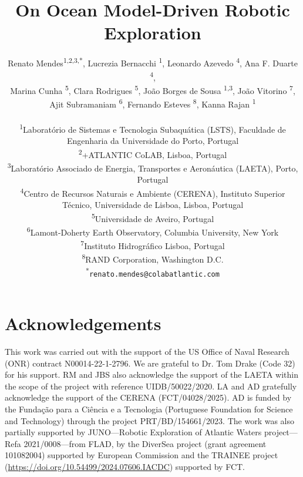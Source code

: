 \documentclass[11pt]{article}
\title{On Ocean Model-Driven Robotic Exploration}
\author{
Renato Mendes\textsuperscript{1,2,3,*},
Lucrezia Bernacchi \textsuperscript{1},
Leonardo Azevedo \textsuperscript{4},
Ana F. Duarte \textsuperscript{4},\\
Marina Cunha \textsuperscript{5},
Clara Rodrigues \textsuperscript{5},
Jo\~{a}o Borges de Sousa \textsuperscript{1,3},
Jo\~{a}o Vitorino \textsuperscript{7},\\
Ajit Subramaniam \textsuperscript{6},
Fernando Esteves \textsuperscript{8},
Kanna Rajan \textsuperscript{1}
\\
\\
\textsuperscript{1}{\scriptsize Laboratório de Sistemas e Tecnologia Subaquática (LSTS), Faculdade de Engenharia da Universidade do Porto, Portugal}\\
\textsuperscript{2}{\scriptsize +ATLANTIC CoLAB, Lisboa, Portugal}\\
\textsuperscript{3}{\scriptsize Laboratório Associado de Energia, Transportes e Aeronáutica (LAETA), Porto, Portugal}\\
\textsuperscript{4}{\scriptsize Centro de Recursos Naturais e Ambiente (CERENA), Instituto Superior T\'{e}cnico, Universidade de Lisboa, Lisboa, Portugal}\\
\textsuperscript{5}{\scriptsize Universidade de Aveiro, Portugal}\\
\textsuperscript{6}{\scriptsize Lamont-Doherty Earth Observatory, Columbia University, New York}\\
\textsuperscript{7}{\scriptsize Instituto Hidrogr{\'a}fico Lisboa, Portugal}\\
\textsuperscript{8}{\scriptsize RAND Corporation, Washington D.C.}\\
\textsuperscript{*}\texttt{{\scriptsize renato.mendes@colabatlantic.com}}
}
\date{}
\begin{document}
\maketitle







\section{Acknowledgements}

This work was carried out with the support of the US Office of Naval
Research (ONR) contract N00014-22-1-2796. We are grateful to Dr. Tom
Drake (Code 32) for his support. RM and JBS also acknowledge the
support of the LAETA within the scope of the project with reference
UIDB/50022/2020. LA and AD gratefully acknowledge the support of the
CERENA (FCT/04028/2025). AD is funded by the Funda\c{c}\~{a}o para a
Ci\^{e}ncia e a Tecnologia (Portuguese Foundation for Science and
Technology) through the project PRT/BD/154661/2023. The work was also
partially supported by JUNO—Robotic Exploration of Atlantic Waters
project—Refa 2021/0008—from FLAD, by the DiverSea project (grant
agreement 101082004) supported by European Commission and the TRAINEE
project (\url{https://doi.org/10.54499/2024.07606.IACDC}) supported by
FCT.


\footnotesize{
  
}
\end{document}
